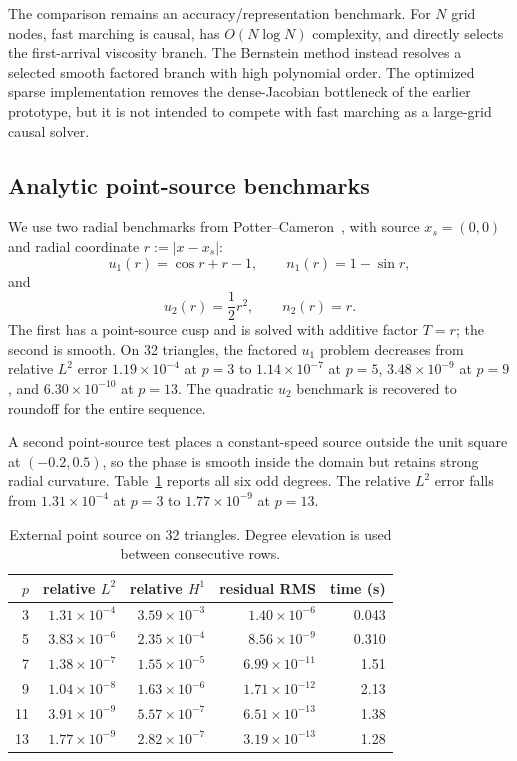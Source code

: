 \documentclass[preprint,12pt]{elsarticle}
\newcommand{\abs}[1]{\left\lvert #1\right\rvert}
\begin{document}
The comparison remains an accuracy/representation benchmark.  For $N$ grid nodes, fast marching is causal, has $O(N\log N)$ complexity, and directly selects the first-arrival viscosity branch.  The Bernstein method instead resolves a selected smooth factored branch with high polynomial order.  The optimized sparse implementation removes the dense-Jacobian bottleneck of the earlier prototype, but it is not intended to compete with fast marching as a large-grid causal solver.

\subsection{Analytic point-source benchmarks}
We use two radial benchmarks from Potter--Cameron~\cite{PotterCameron2019}, with source $x_s=(0,0)$ and radial coordinate $r:=\abs{x-x_s}$:
\[
 u_1(r)=\cos r+r-1,\qquad n_1(r)=1-\sin r,
\]
and
\[
 u_2(r)=\frac12r^2,\qquad n_2(r)=r.
\]
The first has a point-source cusp and is solved with additive factor $T=r$; the second is smooth.  On 32 triangles, the factored $u_1$ problem decreases from relative $L^2$ error $1.19\times10^{-4}$ at $p=3$ to $1.14\times10^{-7}$ at $p=5$, $3.48\times10^{-9}$ at $p=9$, and $6.30\times10^{-10}$ at $p=13$.  The quadratic $u_2$ benchmark is recovered to roundoff for the entire sequence.

A second point-source test places a constant-speed source outside the unit square at $(-0.2,0.5)$, so the phase is smooth inside the domain but retains strong radial curvature.  Table~\ref{tab:point} reports all six odd degrees.  The relative $L^2$ error falls from $1.31\times10^{-4}$ at $p=3$ to $1.77\times10^{-9}$ at $p=13$.

\begin{table}[t]
\centering
\caption{External point source on 32 triangles.  Degree elevation is used between consecutive rows.}
\label{tab:point}
\begin{tabular}{rrrrr}
\toprule
$p$ & relative $L^2$ & relative $H^1$ & residual RMS & time (s)\\
\midrule
3  & $1.31\times10^{-4}$ & $3.59\times10^{-3}$ & $1.40\times10^{-6}$ & 0.043\\
5  & $3.83\times10^{-6}$ & $2.35\times10^{-4}$ & $8.56\times10^{-9}$ & 0.310\\
7  & $1.38\times10^{-7}$ & $1.55\times10^{-5}$ & $6.99\times10^{-11}$ & 1.51\\
9  & $1.04\times10^{-8}$ & $1.63\times10^{-6}$ & $1.71\times10^{-12}$ & 2.13\\
11 & $3.91\times10^{-9}$ & $5.57\times10^{-7}$ & $6.51\times10^{-13}$ & 1.38\\
13 & $1.77\times10^{-9}$ & $2.82\times10^{-7}$ & $3.19\times10^{-13}$ & 1.28\\
\bottomrule
\end{tabular}
\end{table}
\end{document}
